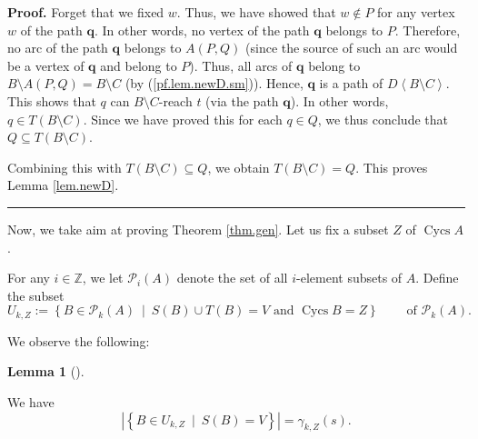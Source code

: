 \documentclass[numbers=enddot,12pt,final,onecolumn,notitlepage]{scrartcl}%
\theoremstyle{definition}
\newtheorem{lem}[theo]{Lemma}
\newenvironment{lemma}[1][]
{\begin{lem}[#1]\begin{leftbar}}
{\end{leftbar}\end{lem}}
\newenvironment{proof}[1][Proof]{\noindent\textbf{#1.} }{\ \rule{0.5em}{0.5em}}
\theoremstyle{plainsl}
\begin{document}
\begin{proof}
Forget that we fixed $w$. Thus, we have showed that $w\notin P$ for any vertex
$w$ of the path $\mathbf{q}$. In other words, no vertex of the path
$\mathbf{q}$ belongs to $P$. Therefore, no arc of the path $\mathbf{q}$
belongs to $A\left(  P,Q\right)  $ (since the source of such an arc would be a
vertex of $\mathbf{q}$ and belong to $P$). Thus, all arcs of $\mathbf{q}$
belong to $B\setminus A\left(  P,Q\right)  =B\setminus C$ (by
(\ref{pf.lem.newD.sm})). Hence, $\mathbf{q}$ is a path of $D\left\langle
B\setminus C\right\rangle $. This shows that $q$ can $B\setminus C$-reach $t$
(via the path $\mathbf{q}$). In other words, $q\in T\left(  B\setminus
C\right)  $. Since we have proved this for each $q\in Q$, we thus conclude
that $Q\subseteq T\left(  B\setminus C\right)  $.

Combining this with $T\left(  B\setminus C\right)  \subseteq Q$, we obtain
$T\left(  B\setminus C\right)  =Q$. This proves Lemma \ref{lem.newD}.
\end{proof}

Now, we take aim at proving Theorem \ref{thm.gen}. Let us fix a subset $Z$ of
$\operatorname*{Cycs}A$.

For any $i\in\mathbb{Z}$, we let $\mathcal{P}_{i}\left(  A\right)  $ denote
the set of all $i$-element subsets of $A$. Define the subset%
\[
U_{k,Z}:=\left\{  B\in\mathcal{P}_{k}\left(  A\right)  \ \mid\ S\left(
B\right)  \cup T\left(  B\right)  =V\text{ and }\operatorname*{Cycs}%
B=Z\right\}  \ \ \ \ \ \ \ \ \ \ \text{of }\mathcal{P}_{k}\left(  A\right)  .
\]


We observe the following:

\begin{lemma}
\label{lem.new-1}We have%
\[
\left\vert \left\{  B\in U_{k,Z}\ \mid\ S\left(  B\right)  =V\right\}
\right\vert =\gamma_{k,Z}\left(  s\right)  .
\]

\end{lemma}
\end{document}
